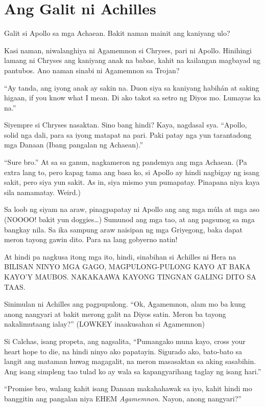 \documentclass[12pt,letterpaper]{report}
\begin{document}
\chapter{Ang Galit ni Achilles}

Galit si Apollo sa mga Achaean. Bakit naman mainit ang kaniyang ulo?

Kasi naman, niwalanghiya ni Agamemnon si Chryses, pari ni Apollo. Hinihingi lamang ni Chryses ang kaniyang anak na babae, kahit na kailangan magbayad ng pantubos. Ano naman sinabi ni Agamemnon sa Trojan?

``Ay tanda, ang iyong anak ay sakin na. Duon siya sa kaniyang habih\'{a}n at saking higaan, if you know what I mean. Di ako takot sa setro ng Diyos mo. Lumayas ka na.''

Siyempre si Chryses nasaktan. Sino bang hindi? Kaya, nagdasal sya. ``Apollo, solid nga dali, para sa iyong matapat na pari. Paki patay nga yun tarantadong mga Danaan (Ibang pangalan ng Achaean).''

``Sure bro.'' At sa sa ganun, nagkameron ng pandemya ang mga Achaean. (Pa extra lang to, pero kapag tama ang basa ko, si Apollo ay hindi nagbigay ng isang sakit, pero siya yun sakit. As in, siya mismo yun pumapatay. Pinapana niya kaya sila namamatay. Weird.)

Sa loob ng siyam na araw, pinagpapatay ni Apollo ang ang mga m\'{u}la at mga aso (NOOOO! bakit yun doggies\dots) Sumunod ang mga tao, at ang pagsunog sa mga bangkay nila. Sa ika sampung araw naisipan ng mga Griyegong, baka dapat meron tayong gawin dito. Para na lang gobyerno natin!

At hindi pa nagkusa itong mga ito, hindi, sinabihan si Achilles ni Hera na BILISAN NINYO MGA GAGO, MAGPULONG-PULONG KAYO AT BAKA KAYO'Y MAUBOS. NAKAKAAWA KAYONG TINGNAN GALING DITO SA TAAS.

Sinimulan ni Achilles ang pagpupulong. ``Ok, Agamemnon, alam mo ba kung anong nangyari at bakit merong galit na Diyos satin. Meron ba tayong nakalimutaang ialay?'' (LOWKEY inaakusahan si Agamemnon)

Si Calchas, isang propeta, ang nagsalita, ``Pumangako muna kayo, cross your heart hope to die, na hindi ninyo ako papatayin. Sigurado ako, bato-bato sa langit ang mataman huwag magagalit, na meron masasaktan sa aking sasabihin. Ang isang simpleng tao tulad ko ay wala sa kapangyarihang taglay ng isang hari.''

``Promise bro, walang kahit isang Danaan makahahawak sa iyo, kahit hindi mo banggitin ang pangalan niya EHEM \textit{Agamemnon}. Nayon, anong nangyari?''
\end{document}
